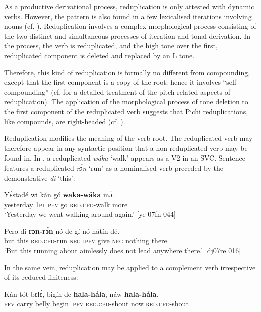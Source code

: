 As a productive derivational process, reduplication is only attested with dynamic verbs. However, the pattern is also found in a few lexicalised iterations involving nouns (cf. ). Reduplication involves a complex morphological process consisting of the two distinct and simultaneous processes of iteration and tonal derivation. In the process, the verb is reduplicated, and the high tone over the first, reduplicated component is deleted and replaced by an L tone.


Therefore, this kind of reduplication is formally no different from compounding, except that the first component is a copy of the root; hence it involves “self-compounding” \citep[6]{Downing2001} (cf.  for a detailed treatment of the pitch-related aspects of reduplication). The application of the morphological process of tone deletion to the first component of the reduplicated verb suggests that Pichi reduplications, like compounds, are right-headed (cf. \citealt[117]{Odden1996}).



Reduplication modifies the meaning of the verb root. The reduplicated verb may therefore appear in any syntactic position that a non-reduplicated verb may be found in. In , a reduplicated \textit{wáka} ‘walk’ appears as a V2 in an SVC. Sentence  features a reduplicated \textit{rɔ́n} ‘run’ as a nominalised verb preceded by the demonstrative \textit{dí} ‘this’: 

\ea%
    \label{ex:key:135}
    \gll Yɛ́stadé    wi  kán  gó  \textbf{waka-wáka}  mɔ́.\\
yesterday  \textsc{1pl}  \textsc{pfv}  go  \textsc{red}.\textsc{cpd}{}-walk  more\\
\glt ‘Yesterday we went walking around again.’ [ye 07fn 044]\\

\z

\ea%
    \label{ex:key:136}
    \gll Pero    dí  \textbf{rɔn-rɔ́n}    nó  de  gí  nó  nátín  dé.\\
but    this  \textsc{red.cpd}{}-run  \textsc{neg}  \textsc{ipfv}  give  \textsc{neg}  nothing  there\\

\glt ‘But this running about aimlessly does not lead anywhere there.’ [dj07re 016]
\z

In the same vein, reduplication may be applied to a complement verb irrespective of its reduced finiteness:


\ea%
    \label{ex:key:137}
    \gll Kán  tót    bɛlɛ́,    bigín  de  \textbf{hala-hála},    náw    \textbf{hala-hála}.\\
\textsc{pfv}  carry  belly  begin  \textsc{ipfv}  \textsc{red.cpd-}shout    now    \textsc{red.cpd-}shout\\

